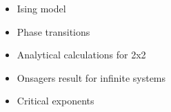 \begin{itemize}
\item Ising model
\item Phase transitions
\item Analytical calculations for 2x2
\item Onsagers result for infinite systems
\item Critical exponents
\end{itemize}
